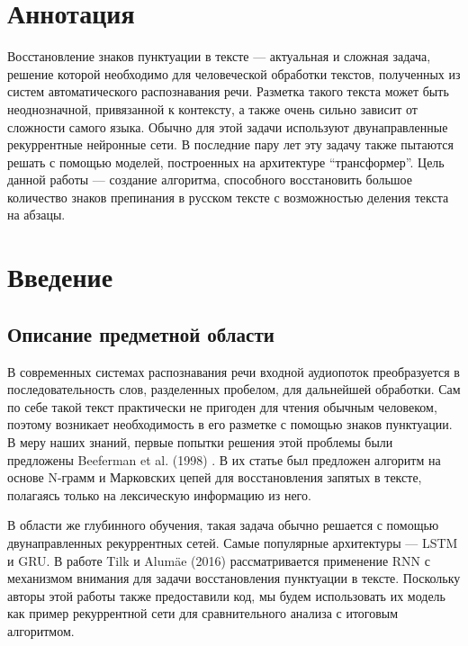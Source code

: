 \documentclass[a4paper,14pt]{extarticle}
\begin{document}

\newpage

{
	\hypersetup{linkcolor=black}
	\tableofcontents
}

\newpage

\section*{Аннотация}

Восстановление знаков пунктуации в тексте --- актуальная и сложная задача, решение которой необходимо для человеческой обработки текстов, полученных из систем автоматического распознавания речи.
Разметка такого текста может быть неоднозначной, привязанной к контексту, а также очень сильно зависит от сложности самого языка.
Обычно для этой задачи используют двунаправленные рекуррентные нейронные сети.
В последние пару лет эту задачу также пытаются решать с помощью моделей, построенных на архитектуре \enquote{трансформер}.
Цель данной работы --- создание алгоритма, способного восстановить большое количество знаков препинания в русском тексте с возможностью деления текста на абзацы.

\section{Введение}

\subsection{Описание предметной области}

В современных системах распознавания речи входной аудиопоток преобразуется в последовательность слов, разделенных пробелом, для дальнейшей обработки.
Сам по себе такой текст практически не пригоден для чтения обычным человеком, поэтому возникает необходимость в его разметке с помощью знаков пунктуации.
В меру наших знаний, первые попытки решения этой проблемы были предложены Beeferman et al. (1998) \cite{beeferman_cyberpunc:_1998}.
В их статье был предложен алгоритм на основе N-грамм и Марковских цепей для восстановления запятых в тексте, полагаясь только на лексическую информацию из него.

В области же глубинного обучения, такая задача обычно решается с помощью двунаправленных рекуррентных сетей.
Самые популярные архитектуры --- LSTM и GRU.
В работе Tilk и Alumäe (2016) \cite{tilk_bidirectional_2016} рассматривается применение RNN с механизмом внимания для задачи восстановления пунктуации в тексте.
Поскольку авторы этой работы также предоставили код, мы будем использовать их модель как пример рекуррентной сети для сравнительного анализа с итоговым алгоритмом.
\end{document}

